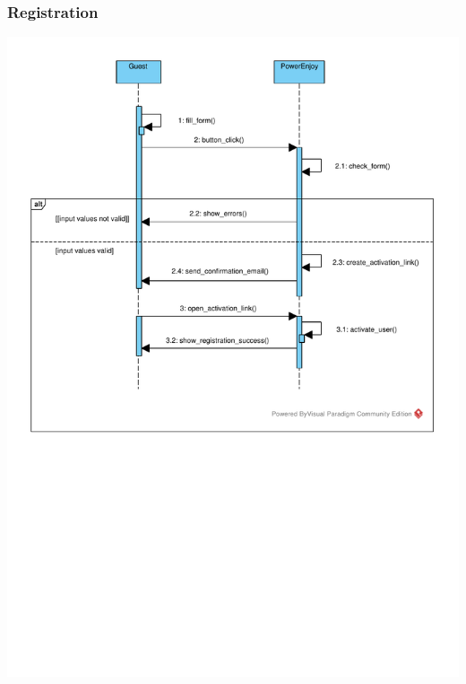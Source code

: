  \subsubsection{Registration}
\includegraphics[width=\textwidth, keepaspectratio]{../images/diagram/sequence/registration.pdf}


